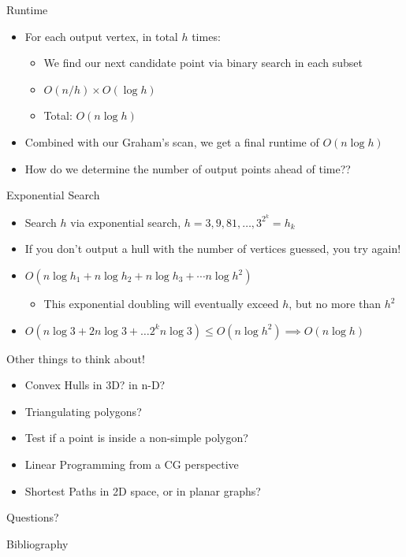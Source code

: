 \documentclass[aspectratio=169]{beamer}
\begin{document}
\begin{frame}{Runtime}
    \begin{itemize}
        \item For each output vertex, in total $h$ times: \pause
        \begin{itemize}
            \item We find our next candidate point via binary search in each subset
            \item $O(n/h) \times O( \log h)$
            \item Total: $O(n \log h)$ \pause
        \end{itemize}
        \item Combined with our Graham's scan, we get a final runtime of $O(n \log h)$ \pause
        \item How do we determine the number of output points ahead of time??
    \end{itemize}
\end{frame}

\begin{frame}{Exponential Search}
    \begin{itemize}
        \item Search $h$ via exponential search, $h=3, 9, 81, \dots, 3^{2^k} = h_k$ \pause 
        \item If you don't output a hull with the number of vertices guessed, you try again! \pause
        \item $O(n \log h_1 + n \log h_2 + n \log h_3 + \cdots n \log h^2)$ \pause
        \begin{itemize}
            \item This exponential doubling will eventually exceed $h$, but no more than $h^2$ \pause
        \end{itemize}
        \item $O(n \log 3 + 2 n \log 3 + \dots 2^k n \log 3) \leq O(n \log h^2) \implies O(n \log h)$
    \end{itemize}
\end{frame}

\begin{frame}{Other things to think about!}
    \begin{itemize}
        \item Convex Hulls in 3D? in n-D?
        \item Triangulating polygons?
        \item Test if a point is inside a non-simple polygon?
        \item Linear Programming from a CG perspective
        \item Shortest Paths in 2D space, or in planar graphs?
    \end{itemize}
\end{frame}

\begin{frame}{}
      \begin{center}
    {\color{sigma@mainblue} \LARGE Questions?}
  \end{center}
\end{frame}

\begin{frame}[allowframebreaks]{Bibliography}
    \tiny
    
    
\end{frame}
\end{document}
